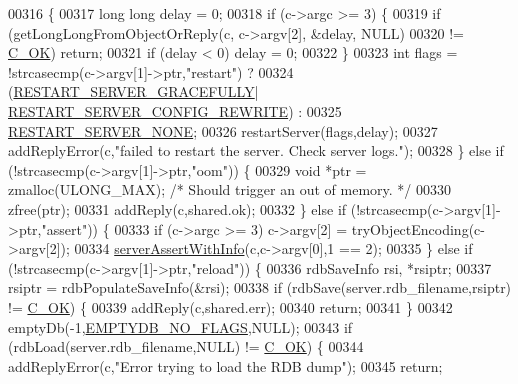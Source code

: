 \begin{DoxyCode}
{{{{00316     \{
00317         \textcolor{keywordtype}{long} \textcolor{keywordtype}{long} delay = 0;
00318         \textcolor{keywordflow}{if} (c->argc >= 3) \{
00319             \textcolor{keywordflow}{if} (getLongLongFromObjectOrReply(c, c->argv[2], &delay, NULL)
00320                 != \hyperlink{server_8h_a303769ef1065076e68731584e758d3e1}{C\_OK}) \textcolor{keywordflow}{return};
00321             \textcolor{keywordflow}{if} (delay < 0) delay = 0;
00322         \}
00323         \textcolor{keywordtype}{int} flags = !strcasecmp(c->argv[1]->ptr,\textcolor{stringliteral}{"restart"}) ?
00324             (\hyperlink{server_8h_af951fdb3aa8efbce7cde83e8a31fff6a}{RESTART\_SERVER\_GRACEFULLY}|
      \hyperlink{server_8h_a57b24bdd0dc4a156941789096e9e1f44}{RESTART\_SERVER\_CONFIG\_REWRITE}) :
00325              \hyperlink{server_8h_ace2d8a1393b982e49efd5a23adb305b1}{RESTART\_SERVER\_NONE};
00326         restartServer(flags,delay);
00327         addReplyError(c,\textcolor{stringliteral}{"failed to restart the server. Check server logs."});
00328     \} \textcolor{keywordflow}{else} \textcolor{keywordflow}{if} (!strcasecmp(c->argv[1]->ptr,\textcolor{stringliteral}{"oom"})) \{
00329         \textcolor{keywordtype}{void} *ptr = zmalloc(ULONG\_MAX); \textcolor{comment}{/* Should trigger an out of memory. */}
00330         zfree(ptr);
00331         addReply(c,shared.ok);
00332     \} \textcolor{keywordflow}{else} \textcolor{keywordflow}{if} (!strcasecmp(c->argv[1]->ptr,\textcolor{stringliteral}{"assert"})) \{
00333         \textcolor{keywordflow}{if} (c->argc >= 3) c->argv[2] = tryObjectEncoding(c->argv[2]);
00334         \hyperlink{server_8h_a7308f76cbff9a8d3797fe78190b91282}{serverAssertWithInfo}(c,c->argv[0],1 == 2);
00335     \} \textcolor{keywordflow}{else} \textcolor{keywordflow}{if} (!strcasecmp(c->argv[1]->ptr,\textcolor{stringliteral}{"reload"})) \{
00336         rdbSaveInfo rsi, *rsiptr;
00337         rsiptr = rdbPopulateSaveInfo(&rsi);
00338         \textcolor{keywordflow}{if} (rdbSave(server.rdb\_filename,rsiptr) != \hyperlink{server_8h_a303769ef1065076e68731584e758d3e1}{C\_OK}) \{
00339             addReply(c,shared.err);
00340             \textcolor{keywordflow}{return};
00341         \}
00342         emptyDb(-1,\hyperlink{server_8h_a83a0ecde3a9f1f6bbcae9f4b966a509b}{EMPTYDB\_NO\_FLAGS},NULL);
00343         \textcolor{keywordflow}{if} (rdbLoad(server.rdb\_filename,NULL) != \hyperlink{server_8h_a303769ef1065076e68731584e758d3e1}{C\_OK}) \{
00344             addReplyError(c,\textcolor{stringliteral}{"Error trying to load the RDB dump"});
00345             \textcolor{keywordflow}{return};
}}}}
\end{DoxyCode}
